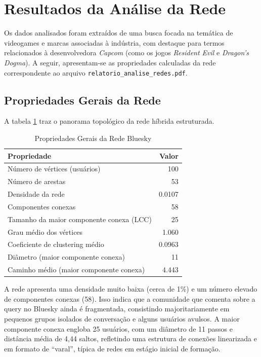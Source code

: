 \documentclass[12pt,a4paper]{article}
\begin{document}
\section{Resultados da Análise da Rede}
Os dados analisados foram extraídos de uma busca focada na temática de videogames e marcas associadas à indústria, com destaque para termos relacionados à desenvolvedora \textit{Capcom} (como os jogos \textit{Resident Evil} e \textit{Dragon's Dogma}). A seguir, apresentam-se as propriedades calculadas da rede correspondente ao arquivo \texttt{relatorio\_analise\_redes.pdf}.

\subsection{Propriedades Gerais da Rede}
A tabela \ref{tab:basic_props} traz o panorama topológico da rede híbrida estruturada.

\begin{table}[H]
\centering
\caption{Propriedades Gerais da Rede Bluesky}
\label{tab:basic_props}
\begin{tabular}{lr}
\toprule
\textbf{Propriedade} & \textbf{Valor} \\
\midrule
Número de vértices (usuários) & 100 \\
Número de arestas & 53 \\
Densidade da rede & 0.0107 \\
Componentes conexas & 58 \\
Tamanho da maior componente conexa (LCC) & 25 \\
Grau médio dos vértices & 1.060 \\
Coeficiente de clustering médio & 0.0963 \\
Diâmetro (maior componente conexa) & 11 \\
Caminho médio (maior componente conexa) & 4.443 \\
\bottomrule
\end{tabular}
\end{table}

A rede apresenta uma densidade muito baixa (cerca de 1\%) e um número elevado de componentes conexas (58). Isso indica que a comunidade que comenta sobre a query no Bluesky ainda é fragmentada, consistindo majoritariamente em pequenos grupos isolados de conversação e alguns usuários avulsos. A maior componente conexa engloba 25 usuários, com um diâmetro de 11 passos e distância média de 4,44 saltos, refletindo uma estrutura de conexões linearizada e em formato de ``varal'', típica de redes em estágio inicial de formação.
\end{document}
